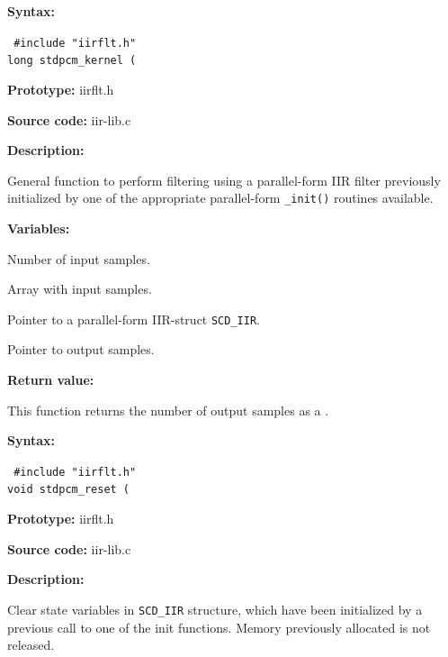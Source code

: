 {\bf Syntax: }

{\tt
\#include "iirflt.h"\\
long stdpcm\_kernel (
}

{\bf Prototype: }    iirflt.h

{\bf Source code: }  iir-lib.c

{\bf Description: }

General function to perform filtering using a parallel-form
IIR  filter previously initialized by one of the appropriate parallel-form
{\tt *\_init()} routines available.

{\bf Variables: }
\begin{Descr}{\DescrLen}
\item[\pbox{20mm}{\em lseg}] %
        Number of input samples.

\item[\pbox{20mm}{\em x\_ptr}] %
        Array with input samples.

\item[\pbox{20mm}{\em iir\_ptr}] %
        Pointer to a parallel-form IIR-struct {\tt SCD\_IIR}.

\item[\pbox{20mm}{\em y\_ptr}] %
        Pointer to output samples.
\end{Descr}


{\bf Return value: }

This function returns the number of output samples as a \long.



{\bf Syntax: }

{\tt
\#include "iirflt.h"\\
void stdpcm\_reset (
}

{\bf Prototype: }    iirflt.h

{\bf Source code: }  iir-lib.c

{\bf Description: }

Clear state variables in {\tt SCD\_IIR} structure, which have been
initialized by a previous call to one of the init functions. Memory
previously allocated is not released.

